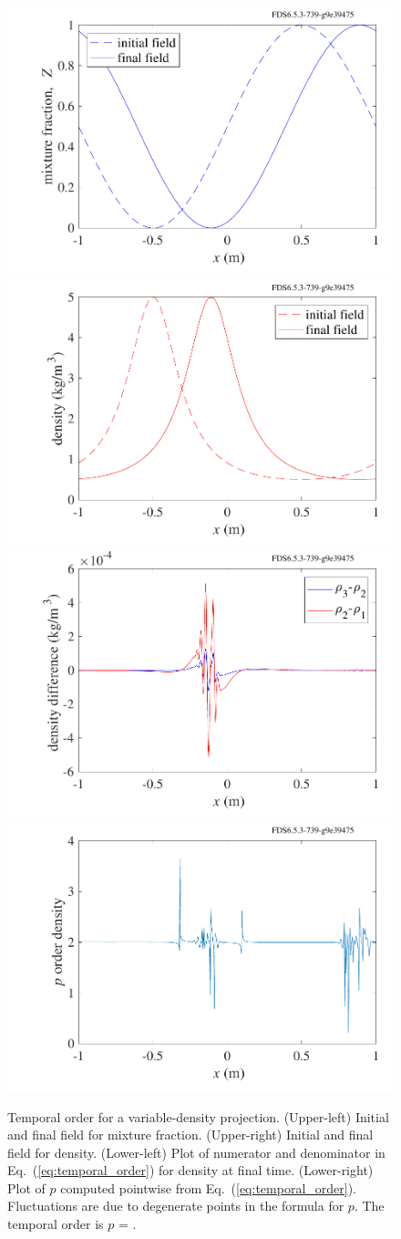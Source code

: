 \documentclass[11pt]{book}
\begin{document}
\begin{figure}[ht]
\centering
\includegraphics[width=.49\textwidth]{SCRIPT_FIGURES/saad_Z}
\includegraphics[width=.49\textwidth]{SCRIPT_FIGURES/saad_rho}
\includegraphics[width=.49\textwidth]{SCRIPT_FIGURES/saad_rho_diff}
\includegraphics[width=.49\textwidth]{SCRIPT_FIGURES/saad_temporal_order_rho}
\caption[The {\ct saad} temporal order test case]{Temporal order for a variable-density projection.  (Upper-left) Initial and final field for mixture fraction.  (Upper-right) Initial and final field for density.  (Lower-left) Plot of numerator and denominator in Eq.~(\ref{eq:temporal_order}) for density at final time. (Lower-right) Plot of $p$ computed pointwise from Eq.~(\ref{eq:temporal_order}).  Fluctuations are due to degenerate points in the formula for $p$.  The temporal order is $p$ = \!.}
\label{fig:saad_temporal_order}
\end{figure}
\end{document}
